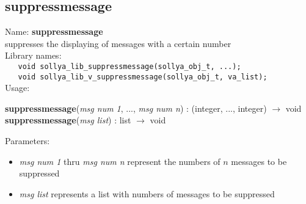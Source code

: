 \subsection{suppressmessage}
\label{labsuppressmessage}
\noindent Name: \textbf{suppressmessage}\\
\phantom{aaa}suppresses the displaying of messages with a certain number\\[0.2cm]
\noindent Library names:\\
\verb|   void sollya_lib_suppressmessage(sollya_obj_t, ...);|\\
\verb|   void sollya_lib_v_suppressmessage(sollya_obj_t, va_list);|\\[0.2cm]
\noindent Usage: 
\begin{center}
\textbf{suppressmessage}(\emph{msg num 1}, ..., \emph{msg num n})   : (\textsf{integer}, ..., \textsf{integer}) $\rightarrow$ \textsf{void}\\
\textbf{suppressmessage}(\emph{msg list})   : \textsf{list} $\rightarrow$ \textsf{void}\\
\end{center}
Parameters: 
\begin{itemize}
\item \emph{msg num 1} thru \emph{msg num n} represent the numbers of $n$ messages to be suppressed
\item \emph{msg list} represents a list with numbers of messages to be suppressed
\end{itemize}
